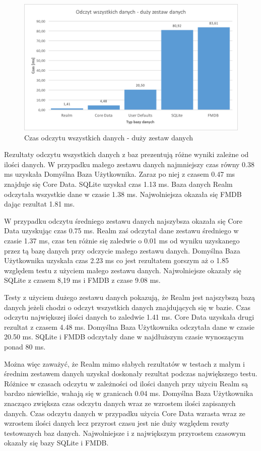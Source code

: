 \newpage

\begin{figure}[h]
\centering
	\includegraphics[width=15cm]{img/read_data/read_all/read_all_test_big.png}
	\caption{Czas odczytu wszystkich danych - duży zestaw danych}
	\label{fig: read-data-big}
\end{figure}

Rezultaty odczytu wszystkich danych z baz prezentują różne wyniki zależne od ilości danych. W przypadku małego zestawu danych najmniejszy czas równy 0.38 ms uzyskała Domyślna Baza Użytkownika. Zaraz po niej z czasem 0.47 ms znajduje się Core Data. SQLite uzyskał czas 1.13 ms. Baza danych Realm odczytała wszystkie dane w czasie 1.38 ms. Najwolniejsza okazała się FMDB dając rezultat 1.81 ms. 

W przypadku odczytu średniego zestawu danych najszybsza okazała się Core Data uzyskując czas 0.75 ms. Realm zaś odczytał dane zestawu średniego w czasie 1.37 ms, czas ten różnie się zaledwie o 0.01 ms od wyniku uzyskanego przez tą bazę danych przy odczycie małego zestawu danych. Domyślna Baza Użytkownika uzyskała czas 2.23 ms co jest rezultatem gorszym aż o 1.85 względem testu z użyciem małego zestawu danych. Najwolniejsze okazały się SQLite z czasem 8,19 ms i FMDB z czase 9.08 ms. 

Testy z użyciem dużego zestawu danych pokazują, że Realm jest najszybszą bazą danych jeżeli chodzi o odczyt wszystkich danych znajdujących się w bazie. Czas odczytu największej ilości danych to zaledwie 1.41 ms. Core Data uzyskała drugi rezultat z czasem 4.48 ms. Domyślna Baza Użytkownika odczytała dane w czasie 20.50 ms. SQLite i FMDB odczytały dane w najdłuższym czasie wynoszącym ponad 80 ms. 

Można więc zaważyć, że Realm mimo słabych rezultatów w testach z małym i średnim zestawem danych uzyskał doskonały rezultat podczas największego testu. Różnice w czasach odczytu w zależności od ilości danych przy użyciu Realm są bardzo niewielkie, wahają się w granicach 0.04 ms. Domyślna Baza Użytkownika znacząco zwiększa czas odczytu danych wraz ze wzrostem ilości zapisanych danych. Czas odczytu danych w przypadku użycia Core Data wzrasta wraz ze wzrostem ilości danych lecz przyrost czasu jest nie  duży względem reszty testowanych baz danych. Najwolniejsze i z największym przyrostem czasowym okazały się bazy SQLite i FMDB. 

